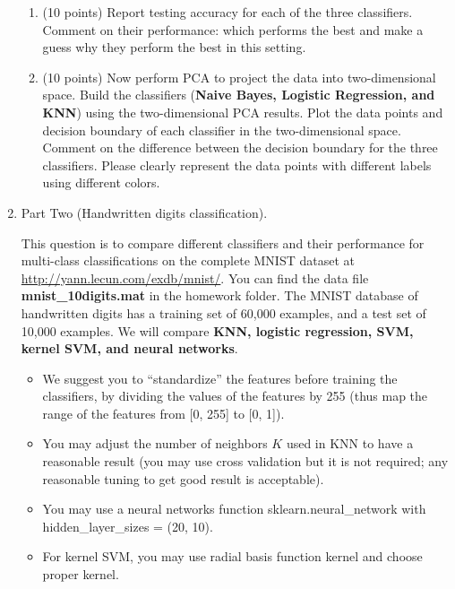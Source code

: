\documentclass[twoside,10pt]{article}
\begin{document}
\begin{enumerate}
\begin{enumerate}

	\item (10 points) Report testing accuracy for each of the three classifiers.  Comment on their performance: which performs the best and make a guess why they perform the best in this setting. 
	\item (10 points) Now perform PCA to project the data into two-dimensional space. Build the classifiers  ({\bf Naive Bayes, Logistic Regression, and KNN}) using the two-dimensional PCA results. Plot the data points and decision boundary of each classifier in the two-dimensional space. Comment on the difference between the decision boundary for the three classifiers. Please clearly represent the data points with different labels using different colors.
	
\end{enumerate}




\item{Part Two (Handwritten digits classification).} 

This question is to compare different classifiers and their performance for multi-class classifications on the complete MNIST dataset at \url{http://yann.lecun.com/exdb/mnist/}. You can find the data file \textbf{mnist\_10digits.mat} in the homework folder. The MNIST database of handwritten digits has a training set of 60,000 examples, and a test set of 10,000 examples. We will compare {\bf KNN, logistic regression, SVM, kernel SVM, and  neural networks}. 

\begin{itemize}

\item We suggest you to ``standardize'' the features before training the classifiers, by dividing the values of the features by 255 (thus map the range of the features from [0, 255] to [0, 1]).

\item You may adjust the number of neighbors $K$ used in KNN to have a reasonable result (you may use cross validation but it is not required; any reasonable tuning to get good result is acceptable).

\item You may use a neural networks function \textsf{sklearn.neural\_network} with \textsf{hidden\_layer\_sizes = (20, 10)}. 


\item For kernel SVM, you may use  radial basis function kernel and choose proper kernel.


\end{itemize}
\end{enumerate}
\end{document}
